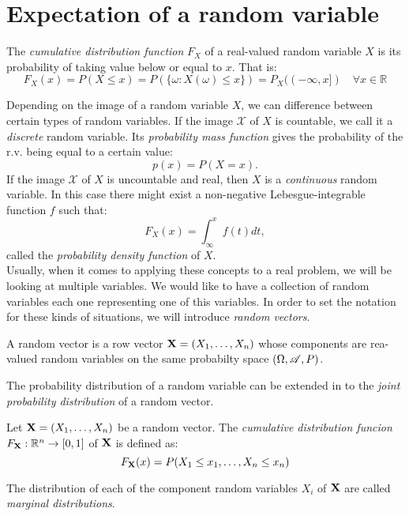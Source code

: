 \section{Expectation of a random variable}

\begin{ndef}
The \emph{cumulative distribution function } $F_X$ of a real-valued random variable $X$ is its probability of taking value below or equal to $x$. That is:
$$
F_X(x) = P(X \leq x) = P(\{\omega : X(\omega) \leq x\}) = P_X((-\infty,x]) \quad \forall x \in \mathbb R
$$
\end{ndef}

Depending on the image of a random variable $X$, we can difference between certain types of random variables. If the image $\mathcal X$ of $X$ is countable, we call it a \emph{discrete} random variable. Its \emph{probability mass function} gives the
probability of the r.v. being equal to a certain value:
$$
p(x) = P(X = x).
$$
If the image $\mathcal X$ of $X$ is uncountable and real, then $X$ is a \emph{continuous} random variable. In this case there might exist a non-negative Lebesgue-integrable function $f$ such that:
$$
F_X(x) = \int_{\infty}^x f(t) dt,
$$
called the \emph{probability density function} of $X$.\\


Usually, when it comes to applying these concepts to a real problem, we will be looking at multiple variables. We would like to have a collection of random variables each one representing one of this variables.
In order to set the notation for these kinds of situations, we will introduce \emph{random vectors}.

\begin{ndef}
  A random vector is a row vector $\mathbf{X} = (X_1,\dots,X_n)$ whose components are rea-valued random variables on the same probabilty space $(\Omega,\mathscr{A},P)$.
\end{ndef}

The probability distribution of a random variable can be extended in to the \emph{joint probability distribution} of a random vector.

\begin{ndef}
Let $\mathbf{X} = (X_1,\dots,X_n)$ be a random vector. The \emph{cumulative distribution funcion} $F_{\mathbf{X}} : \mathbb{R}^n \to [0,1]$ of $\mathbf{X}$ is defined as:
$$
F_{\mathbf{X}}(x) = P(X_1 \leq x_1 , \dots, X_n \leq x_n)
$$
\end{ndef}

The distribution of each of the component random variables $X_i$ of $\mathbf{X}$ are called \emph{marginal distributions}.

